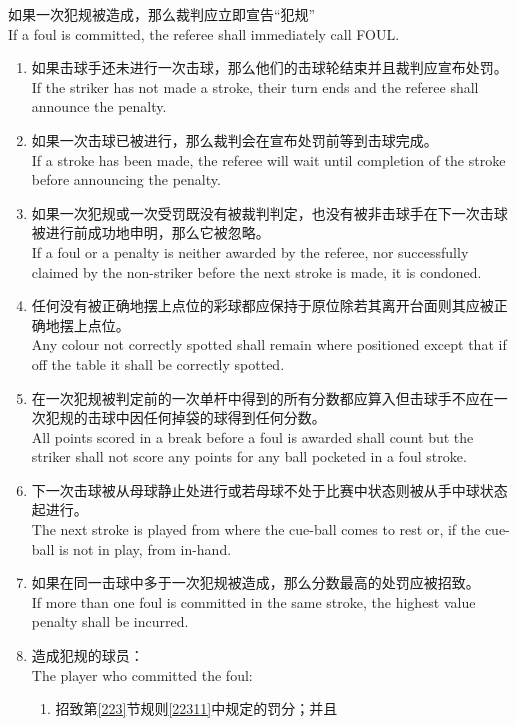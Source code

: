 \noindent 如果一次犯规被造成，那么裁判应立即宣告``犯规''\\
If a foul is committed, the referee shall immediately call FOUL.
\begin{enumerate}[label=(\alph*)]
    \item 如果击球手还未进行一次击球，那么他们的击球轮结束并且裁判应宣布处罚。\\
    If the striker has not made a stroke, their turn ends and the referee shall announce the penalty.
    \item 如果一次击球已被进行，那么裁判会在宣布处罚前等到击球完成。\\
    If a stroke has been made, the referee will wait until completion of the stroke before announcing the penalty.
    \item 如果一次犯规或一次受罚既没有被裁判判定，也没有被非击球手在下一次击球被进行前成功地申明，那么它被忽略。\\
    If a foul or a penalty is neither awarded by the referee, nor successfully claimed by the non-striker before the next stroke is made, it is condoned.
    \item 任何没有被正确地摆上点位的彩球都应保持于原位除若其离开台面则其应被正确地摆上点位。\\
    Any colour not correctly spotted shall remain where positioned except that if off the table it shall be correctly spotted.
    \item 在一次犯规被判定前的一次单杆中得到的所有分数都应算入但击球手不应在一次犯规的击球中因任何掉袋的球得到任何分数。\\
    All points scored in a break before a foul is awarded shall count but the striker shall not score any points for any ball pocketed in a foul stroke.
    \item 下一次击球被从母球静止处进行或若母球不处于比赛中状态则被从手中球状态起进行。\\
    The next stroke is played from where the cue-ball comes to rest or, if the cue-ball is not in play, from in-hand.
    \item 如果在同一击球中多于一次犯规被造成，那么分数最高的处罚应被招致。\\
    If more than one foul is committed in the same stroke, the highest value penalty shall be incurred.
    \item 造成犯规的球员：\\
    The player who committed the foul:
    \begin{enumerate}[label=(\roman*)]
        \item 招致第\ref{223}节规则\ref{22311}中规定的罚分；并且\\

\end{enumerate}
\end{enumerate}
